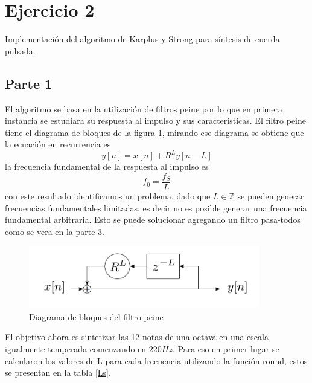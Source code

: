 \documentclass[a4paper]{article}
\begin{document}
\section{Ejercicio 2}
Implementación del algoritmo de Karplus y Strong para síntesis de cuerda pulsada.
\subsection{Parte 1}
El algoritmo se basa en la utilización de filtros peine por lo que en primera instancia se estudiara su respuesta al impulso y sus características.
\newline
El filtro peine tiene el diagrama de bloques de la figura  \ref{peine}, mirando ese diagrama se obtiene que la ecuación en recurrencia es
$$
y[n]=x[n]+R^Ly[n-L]
$$
la frecuencia fundamental de la respuesta al impulso es 
$$
f_0 = \frac{f_S}{L}
$$
con este resultado identificamos un problema, dado que $L\in\mathbb{Z}$ se pueden generar frecuencias fundamentales limitadas, es decir no es posible generar una frecuencia fundamental arbitraria. Esto se puede solucionar agregando un filtro pasa-todos como se vera en la parte 3.
\begin{figure}[h!]
\centering
\includegraphics[width=0.9\textwidth]{peine.png}
\caption{Diagrama de bloques del filtro peine \cite{of8}}
\label{peine}
\end{figure}

\newline
El objetivo ahora es sintetizar las 12 notas de una octava en una escala igualmente temperada comenzando en $220Hz$. Para eso en primer lugar se calcularon los valores de L para cada frecuencia utilizando la función round, estos se presentan en la tabla \ref{Ls}.

\begin{table}[!h]
\centering
{}
\caption{L para que la frecuencia sea la mas cercana a la deseada}
\label{Ls}
\end{table}
\end{document}
